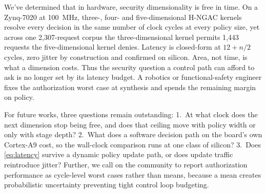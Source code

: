 \documentclass[conference]{IEEEtran}
\newcommand{\new}[1]{#1}
\begin{document}
We've determined that in hardware, security dimensionality is free in time. On a Zynq-7020 at 100~MHz, \new{three-, }four- and five-dimensional H-NGAC kernels resolve every decision in the same number of clock cycles at every policy size, yet across one 2{,}307-request corpus the three-dimensional kernel permits \new{1{,}443} requests the five-dimensional kernel denies. Latency is closed-form at $12 + n/2$ cycles, zero jitter by construction\new{ and confirmed on silicon}. Area, not time, is what a dimension costs. Thus the security question a control path can afford to ask is no longer set by its latency budget. A robotics or functional-safety engineer fixes the authorization worst case at synthesis and spends the remaining margin on policy.

For future works, three questions remain outstanding: \new{1.~At what clock does the next dimension stop being free, and does that ceiling move with policy width or only with stage depth? 2.~What does a software decision path on the board's own Cortex-A9 cost, so the wall-clock comparison runs at one class of silicon?} 3.~Does \eqref{eq:latency} survive a dynamic policy update path, or does update traffic reintroduce jitter? %
Further, we call on the community to report authorization performance as cycle-level worst cases rather than means, because a mean creates probabilistic uncertainty preventing tight control loop budgeting.



\end{document}
